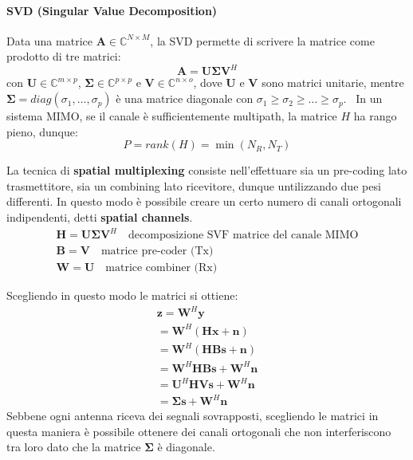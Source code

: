 \paragraph*{SVD (Singular Value Decomposition)}

Data una matrice $\mathbf{A} \in \mathbb{C}^{N \times M}$, la SVD permette di scrivere la matrice come prodotto di tre matrici:
\[
    \mathbf{A} = \mathbf{U} \mathbf{\Sigma} \mathbf{V}^H
\]
con $\mathbf{U} \in \mathbb{C}^{m \times p}$, $\mathbf{\Sigma} \in \mathbb{C}^{p \times p}$ e $\mathbf{V} \in \mathbb{C}^{n \times o}$,
dove $\mathbf{U}$ e $\mathbf{V}$ sono matrici unitarie, mentre $\mathbf{\Sigma} = diag(\sigma_1, \ldots, \sigma_p)$ è una matrice diagonale con $\sigma_1 \geq \sigma_2 \geq \ldots \geq \sigma_p$. 
\
In un sistema MIMO, se il canale è sufficientemente multipath, la matrice $H$ ha rango pieno, dunque:
\[
    P = rank(H) = \min(N_R, N_T)
\]

La tecnica di \textbf{spatial multiplexing} consiste nell'effettuare sia un pre-coding lato trasmettitore, sia un combining lato ricevitore, dunque untilizzando due pesi differenti. In questo modo è possibile creare un certo numero di canali ortogonali indipendenti, detti \textbf{spatial channels}.
\[
    \begin{array}{ll}
        \mathbf{H} = \mathbf{U} \mathbf{\Sigma} \mathbf{V}^H \quad \text{decomposizione SVF matrice del canale MIMO} \\
        \mathbf{B} = \mathbf{V} \quad \text{matrice pre-coder (Tx)} \\
        \mathbf{W} = \mathbf{U} \quad \text{matrice combiner (Rx)}
    \end{array}
\]

Scegliendo in questo modo le matrici si ottiene:
\[
    \begin{array}{ll}
        \mathbf{z} = \mathbf{W}^H \mathbf{y}  \\
        = \mathbf{W}^H \left( \mathbf{H} \mathbf{x} + \mathbf{n}  \right) \\  
        = \mathbf{W}^H \left( \mathbf{H} \mathbf{B} \mathbf{s} + \mathbf{n} \right) \\
        = \mathbf{W}^H \mathbf{H} \mathbf{B} \mathbf{s} + \mathbf{W}^H \mathbf{n}  \\
        = \mathbf{U}^H \mathbf{H} \mathbf{V} \mathbf{s} + \mathbf{W}^H \mathbf{n} \\
        = \mathbf{\Sigma} \mathbf{s} + \mathbf{W}^H \mathbf{n}
    \end{array}
\]
Sebbene ogni antenna riceva dei segnali sovrapposti, scegliendo le matrici in questa maniera è possibile ottenere dei canali ortogonali che non interferiscono tra loro dato che la matrice $\mathbf{\Sigma}$ è diagonale.

